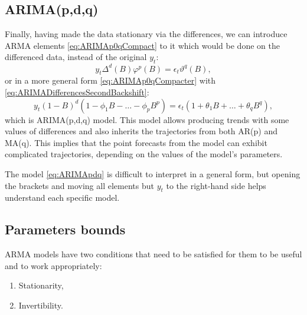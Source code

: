\documentclass[]{book}
\providecommand{\tightlist}{%
  \setlength{\itemsep}{0pt}\setlength{\parskip}{0pt}}
\theoremstyle{definition}
\theoremstyle{definition}
\theoremstyle{definition}
\theoremstyle{definition}
\theoremstyle{remark}
\begin{document}
\hypertarget{arimapdq}{%
\subsection{ARIMA(p,d,q)}\label{arimapdq}}

Finally, having made the data stationary via the differences, we can introduce ARMA elements \eqref{eq:ARIMAp0qCompact} to it which would be done on the differenced data, instead of the original \(y_t\):
\begin{equation}
  y_t \Delta^d(B) \varphi^p(B) = \epsilon_t \vartheta^q(B) ,
  \label{eq:ARIMApdqCompact}
\end{equation}
or in a more general form \eqref{eq:ARIMAp0qCompacter} with \eqref{eq:ARIMADifferencesSecondBackshift}:
\begin{equation}
  y_t (1-B)^d (1 -\phi_1 B -\dots -\phi_p B^p) = \epsilon_t (1 + \theta_1 B + \dots + \theta_q B^q),
  \label{eq:ARIMApdq}
\end{equation}
which is ARIMA(p,d,q) model. This model allows producing trends with some values of differences and also inherits the trajectories from both AR(p) and MA(q). This implies that the point forecasts from the model can exhibit complicated trajectories, depending on the values of the model's parameters.

The model \eqref{eq:ARIMApdq} is difficult to interpret in a general form, but opening the brackets and moving all elements but \(y_t\) to the right-hand side helps understand each specific model.

\hypertarget{ARIMABounds}{%
\subsection{Parameters bounds}\label{ARIMABounds}}

ARMA models have two conditions that need to be satisfied for them to be useful and to work appropriately:

\begin{enumerate}
\def\labelenumi{\arabic{enumi}.}
\tightlist
\item
  Stationarity,
\item
  Invertibility.
\end{enumerate}
\end{document}
